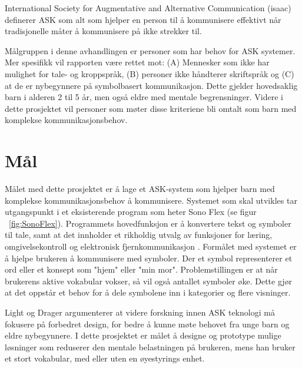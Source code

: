 \documentclass[phd,tocprelim]{cornell}
\begin{document}
International Society for Augmentative and Alternative Communication (\gls{isaac}) \cite{HvaErASK} definerer ASK som alt som hjelper en person til å kommunisere effektivt når tradisjonelle måter å kommunisere på ikke strekker til.

Målgruppen i denne avhandlingen er personer som har behov for ASK systemer. Mer spesifikk vil rapporten være rettet mot: (A) Mennesker som ikke har mulighet for tale- og kroppspråk,  (B) personer ikke håndterer skriftspråk og (C) at de er nybegynnere på symbolbasert kommunikasjon. Dette gjelder hovedsaklig barn i alderen 2 til 5 år, men også eldre med mentale begrensninger. Videre i dette prosjektet vil personer som møter disse kriteriene bli omtalt som barn med komplekse kommunikasjonsbehov. 



\section{Mål}
\label{sec:goal}

Målet med dette prosjektet er å lage et ASK-system som hjelper barn med komplekse kommunikasjonsbehov å kommunisere. Systemet som skal utvikles tar utgangspunkt i et eksisterende program som heter Sono Flex (se figur ~\ref{fig:SonoFlex}). Programmets hovedfunksjon er å konvertere tekst og symboler til tale, samt at det innholder et rikholdig utvalg av funksjoner for læring, omgivelsekontroll og elektronisk fjernkommunikasjon \cite{TobiiCommunicator}. Formålet med systemet er å hjelpe brukeren å kommunisere med symboler. Der et symbol representerer et ord eller et konsept som "hjem" eller "min mor". Problemstillingen er at når brukerens aktive vokabular vokser, så vil også antallet symboler øke. Dette gjør at det oppstår et behov for å dele symbolene inn i kategorier og flere visninger.

Light og Drager \cite{aac} argumenterer at videre forskning innen ASK teknologi må fokusere på forbedret design, for bedre å kunne møte behovet fra unge barn og eldre nybegynnere. I dette prosjektet er målet å designe og prototype mulige løsninger som reduserer den mentale belastningen på brukeren, mens han bruker et stort vokabular, med eller uten en øyestyrings enhet.
\end{document}
